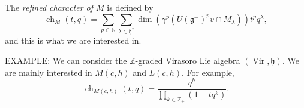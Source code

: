 \documentclass[a4paper, 12pt, reqno]{amsart}
\DeclareMathOperator{\Vir}{Vir}
\DeclareMathOperator{\ch}{ch}
\begin{document}
The \emph{refined character of $M$} is defined by
\begin{equation*}
  \ch_M(t, q) = \sum_{p \in \mathbb{N}}\sum_{\lambda \in \mathfrak{h}^*}\dim(\gamma^p(U(\mathfrak{g}^-)^pv \cap M_{\lambda}))t^pq^{\lambda},
\end{equation*}
and this is what we are interested in.

EXAMPLE: We can consider the $\mathbb{Z}$-graded Virasoro Lie algebra $(\Vir, \mathfrak{h})$.
We are mainly interested in $M(c, h)$ and $L(c, h)$.
For example,
\begin{equation*}
  \ch_{M(c, h)}(t, q) = \frac{q^h}{\prod_{k \in \mathbb{Z}_+}(1 - tq^k)}.
\end{equation*}
\end{document}
